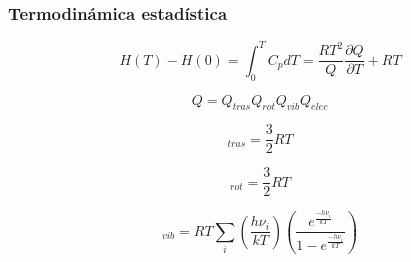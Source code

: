 \documentclass{beamer}
\begin{document}
\begin{frame}[fragile]
\frametitle{Termodinámica estadística}

\begin{equation}
H(T)-H(0) = \int_{0} ^{T} C_{p} dT = \frac{RT^{2}}{Q} \frac{\partial Q}{\partial T} + RT
\label{eq:3.26}
\end{equation}


\begin{equation}
Q = Q_{tras}Q_{rot}Q_{vib}Q_{elec}
\label{eq:3.27}
\end{equation}

\begin{equation}
[H(T)-H(0)]_{tras} = \mathrm{\frac{3}{2}} RT
\label{eq:3.28}
\end{equation}

\begin{equation}
[H(T)-H(0)]_{rot} = \mathrm{\frac{3}{2}} RT
\label{eq:3.29}
\end{equation}



\begin{equation}
[H(T)-H(0)]_{vib}=RT \sum_i \left(\frac{h\nu_i}{kT}\right)\left(\frac{e^{\frac{-h\nu_i}{kT}}}{1-e^{\frac{-h\nu_i}{kT}}}\right)
\label{eq:3.31}
\end{equation}
\end{frame}
\end{document}
